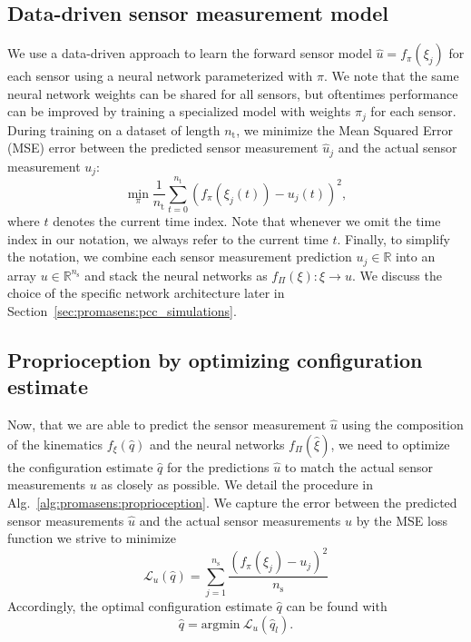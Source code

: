 \subsection{Data-driven sensor measurement model}
\label{sub:promasens:data_driven_approach}
We use a data-driven approach to learn the forward sensor model $\hat{u} = f_{\pi}(\xi_{j})$ for each sensor using a neural network parameterized with $\pi$.
We note that the same neural network weights can be shared for all sensors, but oftentimes performance can be improved by training a specialized model with weights $\pi_j$ for each sensor.
During training on a dataset of length $n_\mathrm{t}$, we minimize the Mean Squared Error (MSE) error between the predicted sensor measurement $\hat{u}_j$ and the actual sensor measurement $u_j$:
\begin{equation}
    \min_{\pi} \frac{1}{n_\mathrm{t}} \sum_{t = 0}^{n_\mathrm{t}} \left ( f_{\pi}(\xi_{j}(t)) - u_j(t) \right )^2,
\end{equation}
where $t$ denotes the current time index.
Note that whenever we omit the time index in our notation, we always refer to the current time $t$.
Finally, to simplify the notation, we combine each sensor measurement prediction $u_j \in \mathbb{R}$ into an array $u \in \mathbb{R}^{n_\mathrm{s}}$ and stack the neural networks as %
$f_\Pi(\xi): \xi \rightarrow u$. We discuss the choice of the specific network architecture later in Section~\ref{sec:promasens:pcc_simulations}.

\subsection{Proprioception by optimizing configuration estimate}
\label{sub:promasens:proprioception_optimization}

Now, that we are able to predict the sensor measurement $\hat{u}$ using the composition of the kinematics $f_\xi(\hat{q})$ and the neural networks $f_\Pi(\hat{\xi})$, we need to optimize the configuration estimate $\hat{q}$ for the predictions $\hat{u}$ to match the actual sensor measurements $u$ as closely as possible.
We detail the procedure in Alg.~\ref{alg:promasens:proprioception}.
We capture the error between the predicted sensor measurements $\hat{u}$ and the actual sensor measurements $u$ by the MSE loss function we strive to minimize
\begin{equation}\label{eq:promasens:proprioception_loss}
    \mathcal{L}_{u}(\hat{q}) = \sum_{j=1}^{n_\mathrm{s}} \frac{\left ( f_\pi(\xi_j) - u_j \right )^2}{n_\mathrm{s}}
\end{equation}
Accordingly, the optimal configuration estimate $\hat{q}$ can be found with
\begin{equation}
    \hat{q} = \mathrm{argmin} \: \mathcal{L}_{u}(\hat{q}_l).
\end{equation}

